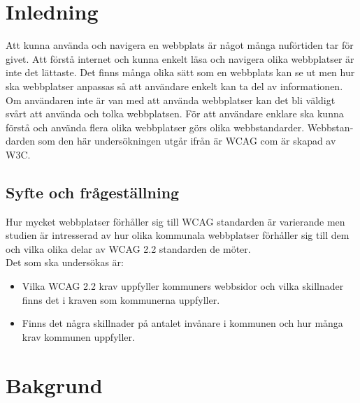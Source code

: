 \documentclass[11p]{article}
\begin{document}
    \begin{otherlanguage}{swedish}
    \newpage
    \tableofcontents
    \newpage

    \section{Inledning} %
    Att kunna använda och navigera en webbplats är något många nuförtiden tar för givet.
    Att förstå internet och kunna enkelt läsa och navigera olika webbplatser är inte det lättaste.
    Det finns många olika sätt som en webbplats kan se ut men hur ska webbplatser anpassas så att användare enkelt kan ta del av informationen.
    Om användaren inte är van med att använda webbplatser kan det bli väldigt svårt att använda och tolka webbplatsen.
    För att användare enklare ska kunna förstå och använda flera olika webbplatser görs olika webbstandarder.
    Webbstandarden som den här undersökningen utgår ifrån är WCAG com är skapad av W3C.

    
    \subsection{Syfte och frågeställning}
    Hur mycket webbplatser förhåller sig till WCAG standarden är varierande men studien är intresserad av hur olika kommunala webbplatser förhåller sig till dem och vilka olika delar av WCAG 2.2 standarden de möter.
    \\Det som ska undersökas är:
    \begin{itemize}
        \item Vilka WCAG 2.2 krav uppfyller kommuners webbsidor och vilka skillnader finns det i kraven som kommunerna uppfyller.
        \item Finns det några skillnader på antalet invånare i kommunen och hur många krav kommunen uppfyller.
    \end{itemize}

    \section{Bakgrund}


\end{otherlanguage}
\end{document}
